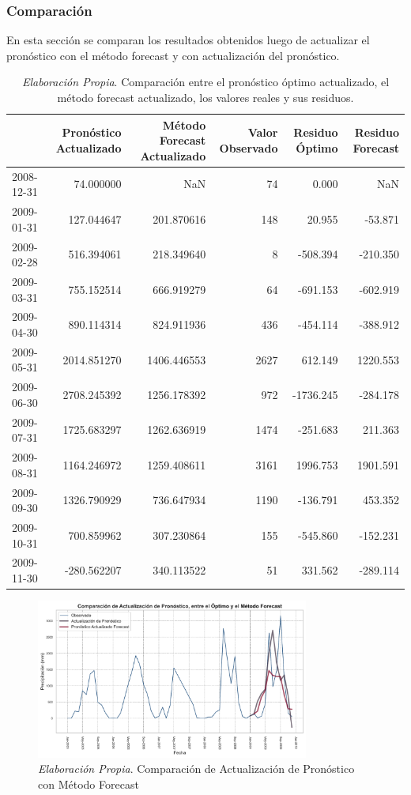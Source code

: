 \documentclass[12pt,letterpaper]{article}   %
\begin{document}
\subsubsection{Comparación}
En esta sección se comparan los resultados obtenidos luego de actualizar el pronóstico con el método forecast y con actualización del pronóstico.
\begin{table}[ht]
\tiny
\centering
\begin{tabular}{lrrrrr}
\toprule
 & \textbf{Pronóstico Actualizado} & \textbf{Método Forecast Actualizado} & \textbf{Valor Observado} & \textbf{Residuo Óptimo} & \textbf{Residuo Forecast} \\
\midrule
2008-12-31 & 74.000000 & NaN & 74 & 0.000 & NaN \\
2009-01-31 & 127.044647 & 201.870616 & 148 & 20.955 & -53.871 \\
2009-02-28 & 516.394061 & 218.349640 & 8 & -508.394 & -210.350 \\
2009-03-31 & 755.152514 & 666.919279 & 64 & -691.153 & -602.919 \\
2009-04-30 & 890.114314 & 824.911936 & 436 & -454.114 & -388.912 \\
2009-05-31 & 2014.851270 & 1406.446553 & 2627 & 612.149 & 1220.553 \\
2009-06-30 & 2708.245392 & 1256.178392 & 972 & -1736.245 & -284.178 \\
2009-07-31 & 1725.683297 & 1262.636919 & 1474 & -251.683 & 211.363 \\
2009-08-31 & 1164.246972 & 1259.408611 & 3161 & 1996.753 & 1901.591 \\
2009-09-30 & 1326.790929 & 736.647934 & 1190 & -136.791 & 453.352 \\
2009-10-31 & 700.859962 & 307.230864 & 155 & -545.860 & -152.231 \\
2009-11-30 & -280.562207 & 340.113522 & 51 & 331.562 & -289.114 \\
\bottomrule
\end{tabular}
\caption{\textit{Elaboración Propia}. Comparación entre el pronóstico óptimo actualizado, el método forecast actualizado, los valores reales y sus residuos.}
\end{table}

\begin{figure}[ht]
    \centering
    \includegraphics[width=0.8\textwidth]{imagenes/06-03-Actualizacion-de-pronostico-comparacion.pdf}
    \caption{\textit{Elaboración Propia}. Comparación de Actualización de Pronóstico con Método Forecast}
\end{figure}
\end{document}

